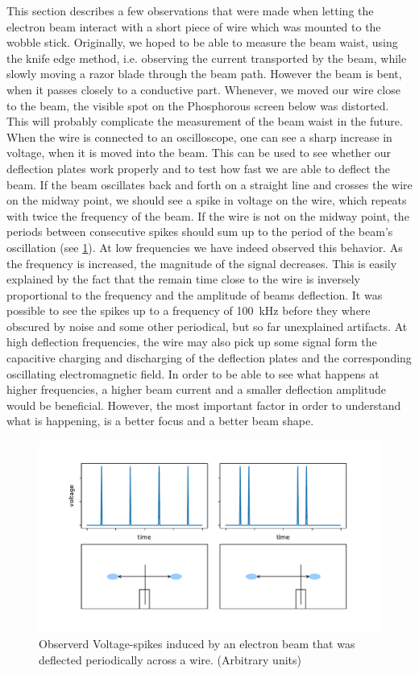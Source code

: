 This section describes a few observations that were made when letting the electron beam interact with a short piece of wire which was mounted to the wobble stick. Originally, we hoped to be able to measure the beam waist, using the knife edge method, i.e. observing the current transported by the beam, while slowly moving a razor blade through the beam path. However the beam is bent, when it passes closely to a conductive part. Whenever, we moved our wire close to the beam, the visible spot on the Phosphorous screen below was distorted. This will probably complicate the measurement of the beam waist in the future. 
When the wire is connected to an oscilloscope, one can see a sharp increase in voltage, when it is moved into the beam. This can be used to see whether our deflection plates work properly and to test how fast we are able to deflect the beam. If the beam oscillates back and forth on a straight line and crosses the wire on the midway point, we should see a spike in voltage on the wire, which repeats with twice the frequency of the beam. If the wire is not on the midway point, the periods between consecutive spikes should sum up to the period of the beam's oscillation (see \cref{fig:spikes}). At low frequencies we have indeed observed this behavior. As the frequency is increased, the magnitude of the signal decreases. This is easily explained by the fact that the remain time close to the wire is inversely proportional to the frequency and the amplitude of beams deflection. It was possible to see the spikes up to a frequency of \SI{100}{\kilo\hertz} before they where obscured by noise and some other periodical, but so far unexplained artifacts.
At high deflection frequencies, the wire may also pick up some signal form the capacitive charging and discharging of the deflection plates and the corresponding oscillating electromagnetic field.
In order to be able to see what happens at higher frequencies, a higher beam current and a smaller deflection amplitude would be beneficial. However, the most important factor in order to understand what is happening, is a better focus and a better beam shape.

\begin{figure}
	\centering
	\includegraphics[width=0.8\linewidth]{Chapters/beam-characterization/Spikes}
	\caption{Observerd Voltage-spikes induced by an electron beam that was deflected periodically across a wire. (Arbitrary units)}
	\label{fig:spikes}
\end{figure}
